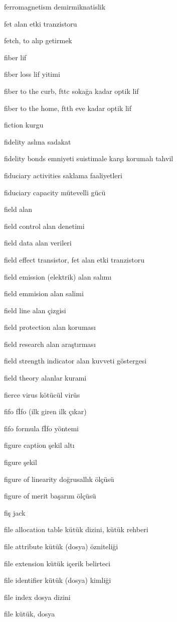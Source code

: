 \documentclass[12pt,fleqn]{article}\usepackage{../../common}
\begin{document}
ferromagnetism demirmiknatislik

fet alan etki tranzistoru

fetch, to alıp getirmek

fiber lif

fiber loss lif yitimi

fiber to the curb, fttc sokağa kadar optik lif

fiber to the home, ftth eve kadar optik lif

fiction kurgu

fidelity aslına sadakat

fidelity bonds emniyeti suistimale karşı korumalı tahvil

fiduciary activities saklama faaliyetleri

fiduciary capacity mütevelli gücü

field alan

field control alan denetimi

field data alan verileri

field effect transistor, fet alan etki tranzistoru

field emission (elektrik) alan salımı

field emmision alan salimi

field line alan çizgisi

field protection alan koruması

field research alan araştırması

field strength indicator alan kuvveti göstergesi

field theory alanlar kurami

fierce virus kötücül virüs

fifo fİfo (ilk giren ilk çıkar)

fifo formula fİfo yöntemi

figure caption şekil altı

figure şekil

figure of linearity doğrusallık ölçüsü

figure of merit başarım ölçüsü

fiş jack

file allocation table kütük dizini, kütük rehberi

file attribute kütük (dosya) özniteliği

file extension kütük içerik belirteci

file identifier kütük (dosya) kimliği

file index dosya dizini

file kütük, dosya
\end{document}
